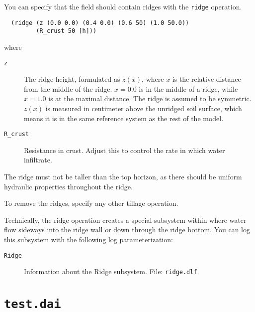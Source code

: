 \documentclass[a4paper,11pt]{article}
\begin{document}
You can specify that the field should contain ridges with the
\texttt{ridge} operation.
\begin{verbatim}
  (ridge (z (0.0 0.0) (0.4 0.0) (0.6 50) (1.0 50.0))
         (R_crust 50 [h]))
\end{verbatim}
where
\begin{description}
\item[\texttt{z}] The ridge height, formulated as $z (x)$, where $x$
  is the relative distance from the middle of the ridge.  $x = 0.0$ is
  in the middle of a ridge, while $x = 1.0$ is at the maximal
  distance.  The ridge is assumed to be symmetric.  $z (x)$ is
  measured in centimeter above the unridged soil surface, which means
  it is in the same reference system as the rest of the model.
\item[\texttt{R\_crust}] Resistance in crust.  Adjust this to control
  the rate in which water infiltrate.
\end{description}
The ridge must not be taller than the top horizon, as there should be
uniform hydraulic properties throughout the ridge.

To remove the ridges, specify any other tillage operation.

Technically, the ridge operation creates a special subsystem within
\daisy{} where water flow sideways into the ridge wall or down through
the ridge bottom.  You can log this subsystem with the following log
parameterization:
\begin{description}
\item[\texttt{Ridge}] Information about the Ridge subsystem.  File:
  \texttt{ridge.dlf}.
\end{description}

\section{\texttt{test.dai}}
\label{app:test}
\end{document}
